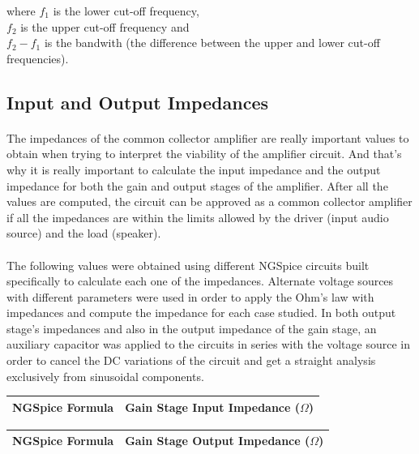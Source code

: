where $f_1$ is the lower cut-off frequency,\\
$f_2$ is the upper cut-off frequency and\\
$f_2-f_1$ is the bandwith (the difference between the upper and lower cut-off frequencies).


\subsection{Input and Output Impedances}

\paragraph{}
The impedances of the common collector amplifier are really important values to obtain when trying to interpret the viability of the amplifier circuit. And that's why it is really important to calculate the input impedance and the output impedance for both the gain and output stages of the amplifier. After all the values are computed, the circuit can be approved as a common collector amplifier if all the impedances are within the limits allowed by the driver (input audio source) and the load (speaker).

\paragraph{}
The following values were obtained using different NGSpice circuits built specifically to calculate each one of the impedances. Alternate voltage sources with different parameters were used in order to apply the Ohm's law with impedances and compute the impedance for each case studied. In both output stage's impedances and also in the output impedance of the gain stage, an auxiliary capacitor was applied to the circuits  in series with the voltage source in order to cancel the DC variations of the circuit and get a straight analysis exclusively from sinusoidal components.

\begin{table}[H] \centering
  \begin{tabular}{|l|r|}
    \hline    
    {\bf NGSpice Formula} & {\bf Gain Stage Input Impedance ($\Omega$)}\\ \hline
    
  \end{tabular}
 \label{tab:inputimp}
\end{table}

\begin{table}[H] \centering
  \begin{tabular}{|l|r|}
    \hline    
    {\bf NGSpice Formula} & {\bf Gain Stage Output Impedance ($\Omega$)}\\ \hline
    
  \end{tabular}
 \label{tab:outimp}
\end{table}

